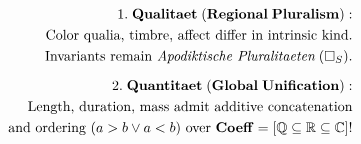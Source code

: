 \documentclass[preview]{standalone}
\begin{document}
\begin{align*}
\special{dvisvgm:raw <g id='unique000'>}1.\;\mathbf{Qualitaet\;(Regional\;Pluralism):}\\\;\;\text{Color qualia, timbre, affect differ in intrinsic kind.}\\\;\;\text{Invariants remain }\textit{Apodiktische Pluralitaeten}\;(\Box_S).\\[6pt]2.\;\mathbf{Quantitaet\;(Global\;Unification):}\\\;\;\text{Length, duration, mass admit additive concatenation}\\\;\;\text{and ordering }(a>b\lor a<b)\text{ over }\mathbf{Coeff}=[\mathbb{Q}\subseteq\mathbb{R}\subseteq\mathbb{C}]!\special{dvisvgm:raw </g>}
\end{align*}
\end{document}

